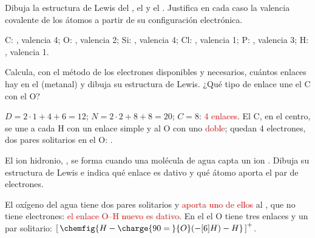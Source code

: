 \begin{exercise}
    Dibuja la estructura de Lewis del , el  y el . Justifica en cada caso la valencia covalente de los
    átomos a partir de su configuración electrónica.
    \begin{solu}
        C: , valencia 4; O: , valencia 2;
        Si: , valencia 4; Cl: , valencia 1; P: , valencia 3;
        H: , valencia 1.
        \begin{center}
            \textcolor{red}{} \qquad
            \textcolor{red}{} \qquad
            \textcolor{red}{}
        \end{center}
    \end{solu}
\end{exercise}

\begin{exercise}
    Calcula, con el método de los electrones disponibles y necesarios, cuántos enlaces hay en el  (metanal) y dibuja su
    estructura de Lewis. ¿Qué tipo de enlace une el C con el O?
    \begin{solu}
        \(D = 2 \cdot 1 + 4 + 6 = 12\); \(N = 2 \cdot 2 + 8 + 8 = 20\); \(C = 8\): \textcolor{red}{4 enlaces}. El C, en el
        centro, se une a cada H con un enlace simple y al O con uno \textcolor{red}{doble}; quedan 4 electrones, dos pares
        solitarios en el O:
        \textcolor{red}{}.
    \end{solu}
\end{exercise}

\begin{exercise}
    El ion hidronio, , se forma cuando una molécula de agua capta un ion . Dibuja su estructura de Lewis e indica
    qué enlace es dativo y qué átomo aporta el par de electrones.
    \begin{solu}
        El oxígeno del agua tiene dos pares solitarios y \textcolor{red}{aporta uno de ellos} al , que no tiene electrones:
        \textcolor{red}{el enlace O--H nuevo es dativo}. En el  el O tiene tres enlaces y un par solitario:
        \(\left[\,\chemfig{H-\charge{90=\:}{O}(-[6]H)-H}\,\right]^+\).
    \end{solu}
\end{exercise}

